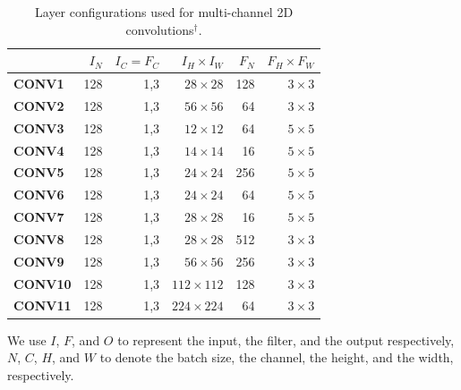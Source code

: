 \begin{table}[]
\caption{Layer configurations used for multi-channel 2D convolutions$^{\dag}$.}
\label{tab:3dconvconfigs}
\begin{threeparttable}
\begin{tabular}{lrrrrr}
\toprule
& \textbf{$I_N$} & \textbf{$I_C=F_C$} & \textbf{$I_H \times I_W$} & \textbf{$F_N$} & \textbf{$F_H \times F_W$} \\
\midrule
\textbf{CONV1} & 128  & 1,3       & $28\times 28$     & 128  & $3\times 3$       \\
\textbf{CONV2} & 128  & 1,3       & $56\times 56$     & 64   & $3\times 3$       \\
\textbf{CONV3} & 128  & 1,3       & $12\times 12$     & 64   & $5\times 5$       \\
\textbf{CONV4} & 128  & 1,3       & $14\times 14$     & 16   & $5 \times 5$       \\
\textbf{CONV5} & 128  & 1,3       & $24\times 24$    & 256  & $5 \times 5$       \\
\textbf{CONV6} & 128  & 1,3       & $24\times 24$     & 64   & $5\times 5$       \\
\textbf{CONV7} & 128  & 1,3       & $28\times 28$     & 16   & $5\times 5$       \\
\textbf{CONV8} & 128  & 1,3       & $28\times 28$     & 512   & $3\times 3$       \\
\textbf{CONV9} & 128  & 1,3       & $56\times 56$     & 256  & $3\times 3$       \\
\textbf{CONV10} & 128  & 1,3       & $112\times 112$     & 128   & $3\times 3$       \\
\textbf{CONV11} &128  & 1,3       & $224\times 224$     & 64   & $3\times 3$      \\
\bottomrule
\end{tabular}
\begin{tablenotes}
\item[\dag] We use $I$, $F$, and $O$ to represent the input, the filter, and the output respectively, $N$, $C$, $H$, and $W$
to denote the batch size, the channel, the height, and the width, respectively.
\end{tablenotes}
\end{threeparttable}
\end{table}

